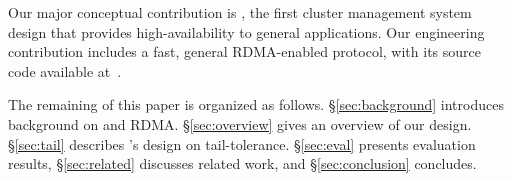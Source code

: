 
Our major conceptual contribution is \xxx, the first cluster management 
system design that provides high-availability to general applications. Our 
engineering contribution includes a fast, general RDMA-enabled \paxos protocol, 
with its source code available at~\cite{falcon:github}.

The remaining of this paper is organized as follows. \S\ref{sec:background} 
introduces background on \paxos and RDMA. \S\ref{sec:overview} gives an 
overview of our \xxx design. \S\ref{sec:tail} describes \xxx's design on 
tail-tolerance. \S\ref{sec:eval} presents evaluation results, 
\S\ref{sec:related} discusses related work, and \S\ref{sec:conclusion} 
concludes.   


